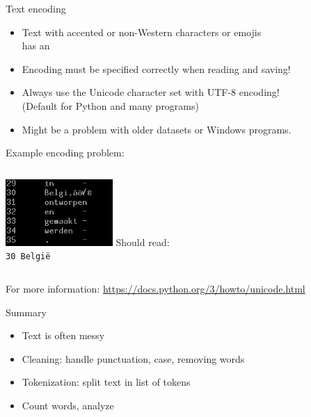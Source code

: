 \documentclass[aspectratio=169,usenames,dvipsnames]{beamer}
\begin{document}
\begin{frame}{Text encoding}
    \begin{itemize}
        \item Text with accented or non-Western characters or emojis \\
            has an 
        \item Encoding must be specified correctly when reading and saving!
        \item Always use the Unicode character set with UTF-8 encoding! \\
            (Default for Python and many programs)
        \item Might be a problem with older datasets or Windows programs.
    \end{itemize}
  
    Example encoding problem:

    \begin{columns}
    \centering
         \includegraphics[width=0.5\textwidth]{fig/encodingissue}
        Should read:\\
        \texttt{30   Belgi\"e}
        \vspace{3em}
    \end{columns}

    \vspace{1em}
    For more information: \url{https://docs.python.org/3/howto/unicode.html}
\end{frame}


\begin{frame}{Summary}
    \begin{itemize}
        \item Text is often messy
        \item Cleaning: handle punctuation, case, removing words
        \item Tokenization: split text in list of tokens
        \item Count words, analyze
    \end{itemize}
\end{frame}
\end{document}
